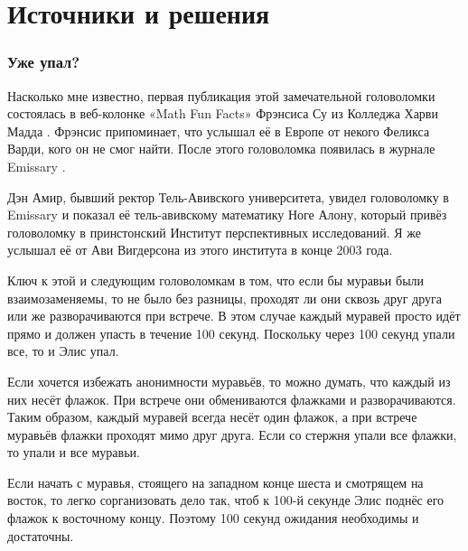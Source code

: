 \section*{Источники и решения}

\subsubsection*{Уже упал?}

Насколько мне известно, первая публикация этой замечательной головоломки состоялась в веб-колонке «Math Fun Facts» Фрэнсиса Су из Колледжа Харви Мадда \cite{math-fun-facts}.
Фрэнсис припоминает, что услышал её в Европе от некого Феликса Варди, кого он не смог найти.
После этого головоломка появилась в журнале Emissary \cite[Весна/Осень 2003]{3}.

Дэн Амир, бывший ректор Тель-Авивского университета, увидел головоломку в Emissary и показал её тель-авивскому математику Ноге Алону, который привёз головоломку в принстонский Институт перспективных исследований.
Я же услышал её от Ави Вигдерсона из этого института в конце 2003 года.

Ключ к этой и следующим головоломкам в том, что если бы муравьи были взаимозаменяемы, то не было без разницы, проходят ли они сквозь друг друга или же разворачиваются при встрече.
В этом случае каждый муравей просто идёт прямо и должен упасть в течение 100 секунд.
Поскольку через 100 секунд упали все, то и Элис упал.

Если хочется избежать анонимности муравьёв, то можно думать, что каждый из них несёт флажок.
При встрече они обмениваются флажками и разворачиваются.
Таким образом, каждый муравей всегда несёт один флажок, а при встрече муравьёв флажки проходят мимо друг друга.
Если со стержня упали все флажки, то упали и все муравьи.

Если начать с муравья, стоящего на западном конце шеста и смотрящем на восток, то легко сорганизовать дело так, чтоб к 100-й секунде Элис поднёс его флажок к восточному концу.
Поэтому 100 секунд ожидания необходимы и достаточны.

